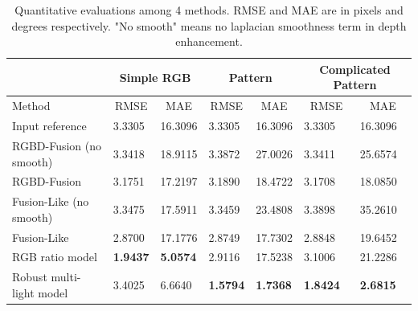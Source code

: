 \begin{table}[!ht]
\caption{Quantitative evaluations among 4 methods. RMSE and MAE are in pixels and degrees respectively. "No smooth" means no laplacian smoothness term in depth enhancement.}
\vspace{1em}
\label{tab:comp_syn_eval}
\centering
\begin{tabular}{lllllll}
                                       & \multicolumn{2}{c}{Simple RGB}                     & \multicolumn{2}{c}{Pattern}                        & \multicolumn{2}{c}{Complicated Pattern}            \\\hline
Method                                 & \multicolumn{1}{c}{RMSE} & \multicolumn{1}{c}{MAE} & \multicolumn{1}{c}{RMSE} & \multicolumn{1}{c}{MAE} & \multicolumn{1}{c}{RMSE} & \multicolumn{1}{c}{MAE} \\\hline\hline
Input reference                              & 3.3305                   & 16.3096                 & 3.3305                   & 16.3096                 & 3.3305                   & 16.3096                 \\
RGBD-Fusion\cite{or2015rgbd} (no smooth)                       & 3.3418                   & 18.9115                 & 3.3872                   & 27.0026                 & 3.3411                   & 25.6574  		\\
RGBD-Fusion\cite{or2015rgbd} & 3.1751                   & 17.2197                 & 3.1890                   & 18.4722                 & 3.1708                   & 18.0850                 \\ 
Fusion-Like (no smooth)                  & 3.3475                   & 17.5911                 & 3.3459                   & 23.4808                 & 3.3898                   & 35.2610                 \\
Fusion-Like                        & 2.8700                   & 17.1776                 & 2.8749                   & 17.7302                 & 2.8848                   & 19.6452                 \\
RGB ratio model                        & \textbf{1.9437}          & \textbf{5.0574}         & 2.9116                   & 17.5238                 & 3.1006                   & 21.2286                 \\
Robust multi-light model               & 3.4025                   & 6.6640                  & \textbf{1.5794}          & \textbf{1.7368}         & \textbf{1.8424}          & \textbf{2.6815}  \\\hline      
\end{tabular}
\end{table}



